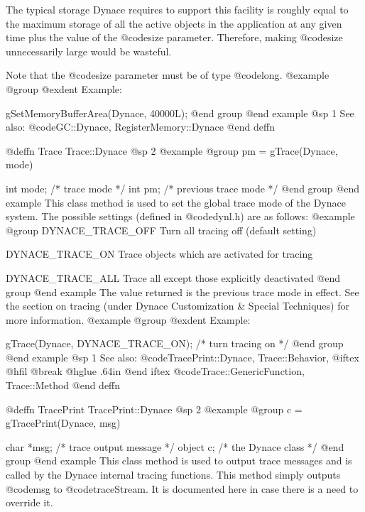 The typical storage Dynace requires to support this facility is roughly
equal to the maximum storage of all the active objects in the
application at any given time plus the value of the @code{size}
parameter.  Therefore, making @code{size} unnecessarily large would
be wasteful.

Note that the @code{size} parameter must be of type @code{long}.
@example
@group
@exdent Example:

gSetMemoryBufferArea(Dynace, 40000L);
@end group
@end example
@sp 1
See also:  @code{GC::Dynace, RegisterMemory::Dynace}
@end deffn










@deffn {Trace} Trace::Dynace
@sp 2
@example
@group
pm = gTrace(Dynace, mode)

int     mode;   /*  trace mode           */
int     pm;     /*  previous trace mode  */
@end group
@end example
This class method is used to set the global trace mode of the Dynace system.
The possible settings (defined in @code{dynl.h}) are as follows:
@example
@group
DYNACE_TRACE_OFF       Turn all tracing off (default setting)

DYNACE_TRACE_ON        Trace objects which are activated for
                       tracing

DYNACE_TRACE_ALL       Trace all except those explicitly
                       deactivated
@end group
@end example
The value returned is the previous trace mode in effect.  See the
section on tracing (under Dynace Customization & Special Techniques) for
more information.
@example
@group
@exdent Example:

gTrace(Dynace, DYNACE_TRACE_ON);   /*  turn tracing on  */
@end group
@end example
@sp 1
See also:  @code{TracePrint::Dynace, Trace::Behavior,}
@iftex
@hfil @break @hglue .64in 
@end iftex
@code{Trace::GenericFunction, Trace::Method}
@end deffn








@deffn {TracePrint} TracePrint::Dynace
@sp 2
@example
@group
c = gTracePrint(Dynace, msg)

char    *msg;   /*  trace output message  */
object  c;      /*  the Dynace class      */
@end group
@end example
This class method is used to output trace messages and is called by
the Dynace internal tracing functions.  This method simply outputs
@code{msg} to @code{traceStream}.  It is documented here in case
there is a need to override it.

